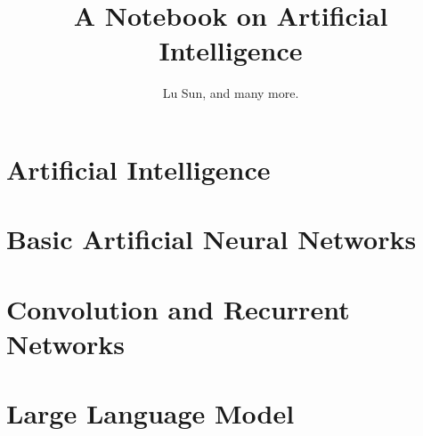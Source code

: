 

\makeindex



\frontmatter

\title{A Notebook on Artificial Intelligence}
\author{Lu Sun, and many more.}

\maketitle


\tableofcontents


\listoffigures
\listoftables

\mainmatter

\part{Artificial Intelligence}

\part{Basic Artificial Neural Networks}







\part{Convolution and Recurrent Networks}





\part{Large Language Model}









\appendix






\printindex


